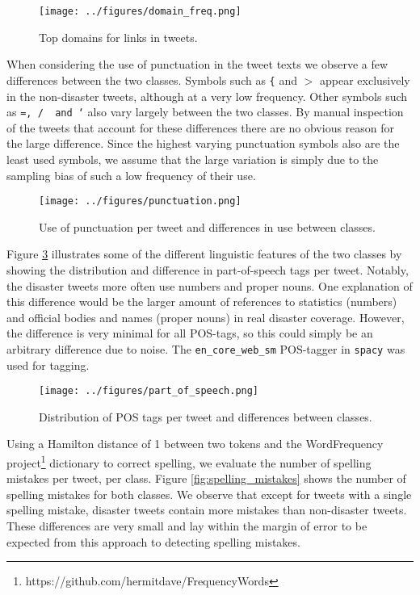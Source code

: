 \documentclass[journal, ]{IEEEtran}
\let\MYoriglatexcaption\caption
\renewcommand{\caption}[2][\relax]{\MYoriglatexcaption[#2]{#2}}
\begin{document}
\begin{figure}[hbt!]
  \centering
  \texttt{[image: ../figures/domain\_freq.png]}
  \caption{Top domains for links in tweets.}
  \label{fig:domain_freq}
\end{figure}

When considering the use of punctuation in the tweet texts we observe a few
differences between the two classes. Symbols such as \texttt{\{} and \texttt{$>$}
appear exclusively in the non-disaster tweets, although at a very low
frequency. Other symbols such as \texttt{=, /\, and `} also vary largely
between the two classes. By manual inspection of the tweets that account for
these differences there are no obvious reason for the large difference. Since
the highest varying punctuation symbols also are the least used symbols, we
assume that the large variation is simply due to the sampling bias of such a
low frequency of their use. 
\begin{figure}[hbt!]
  \centering
  \texttt{[image: ../figures/punctuation.png]}
  \caption{Use of punctuation per tweet and differences in use between classes.}
  \label{fig:punctuation}
\end{figure}

Figure \ref{fig:part_of_speech} illustrates some of the different linguistic
features of the two classes by showing the distribution and difference in
part-of-speech tags per tweet. Notably, the disaster tweets more often use
numbers and proper nouns. One explanation of this difference would be the
larger amount of references to statistics (numbers) and official bodies and
names (proper nouns) in real disaster coverage. However, the difference is very
minimal for all POS-tags, so this could simply be an arbitrary difference due
to noise. The \texttt{en\_core\_web\_sm} POS-tagger in \texttt{spacy} was used for
tagging.

\begin{figure}[hbt!]
  \centering
  \texttt{[image: ../figures/part\_of\_speech.png]}
  \caption{Distribution of POS tags per tweet and differences between classes.}
  \label{fig:part_of_speech}
\end{figure}

Using a Hamilton distance of 1 between two tokens and the WordFrequency
project\footnote{https://github.com/hermitdave/FrequencyWords} dictionary to
correct spelling, we evaluate the number of spelling mistakes per tweet, per
class. Figure \ref{fig:spelling_mistakes} shows the number of spelling
mistakes for both classes. We observe that except for tweets with a single
spelling mistake, disaster tweets contain more mistakes than non-disaster
tweets. These differences are very small and lay within the margin of error to
be expected from this approach to detecting spelling mistakes.
\end{document}
